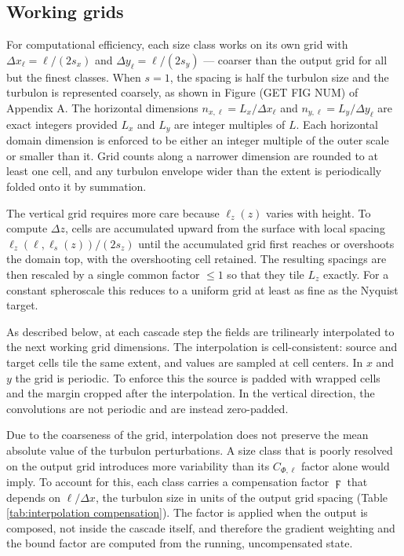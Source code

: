\documentclass{article}
\begin{document}
\subsection{Working grids}\label{ssect:working grids}

For computational efficiency, each size class works on its own grid
with $\Delta x_\ell = \ell/(2s_x)$ and $\Delta y_\ell = \ell/(2s_y)$ --- coarser
than the output grid for all but the finest classes. When $s = 1$, the
spacing is half the turbulon size and the turbulon is represented
coarsely, as shown in Figure (GET FIG NUM) of Appendix A.
The horizontal dimensions $n_{x,\ell} = L_x/\Delta x_\ell$ and $n_{y,\ell} =
L_y/\Delta y_\ell$ are exact integers provided $L_x$ and $L_y$ are integer
multiples of $L$. Each horizontal domain dimension is enforced to be either an integer multiple of the outer scale or smaller than it.
Grid counts along a narrower dimension are rounded to at least one cell, and any turbulon
envelope wider than the extent is periodically folded onto it by summation.

The vertical grid requires more care because $\ell_z(z)$ varies with
height. To compute $\Delta z$, cells are accumulated upward from the surface with local
spacing $\ell_z(\ell, \ell_s(z))/(2s_z)$ until the accumulated grid first reaches
or overshoots the domain top, with the overshooting cell retained. The resulting spacings are then rescaled by a single common factor
$\le 1$ so that they tile $L_z$ exactly. For a constant spheroscale this reduces
to a uniform grid at least as fine as the Nyquist target.

As described below, at each cascade step the fields are trilinearly interpolated to the next working grid dimensions. The interpolation is cell-consistent: source and target cells tile the same extent, and values are sampled at cell centers. In $x$ and $y$ the grid is periodic. To enforce this the source is padded with wrapped cells and the margin cropped after the interpolation. In the vertical direction, the convolutions are not periodic and are instead zero-padded. 

Due to the coarseness of the grid, interpolation does not preserve the mean absolute value of the turbulon perturbations. A size class that is poorly resolved on the output grid introduces more variability than its $C_{\Phi,\ell}$ factor alone would imply. To account for this, each class carries a compensation factor $\digamma$ that depends on $\ell/\Delta x$, the turbulon size in units of the output grid spacing (Table \ref{tab:interpolation compensation}). The factor is applied when the output is composed, not inside the cascade itself, and therefore the gradient weighting and the bound factor are computed from the running, uncompensated state. 
\end{document}
